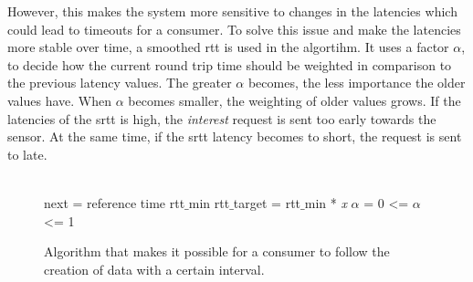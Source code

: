 However, this makes the system more sensitive to changes in the latencies which could lead to timeouts for a consumer. To solve this issue and make the latencies more stable over time, a smoothed rtt is used in the algortihm. It uses a factor $\alpha$, to decide how the current round trip time should be weighted in comparison to the previous latency values. The greater $\alpha$ becomes, the less importance the older values have. When $\alpha$ becomes smaller, the weighting of older values grows.
If the latencies of the srtt is high, the \textit{interest} request is sent too early towards the sensor. At the same time, if the srtt latency becomes to short, the request is sent to late.\\\\

   
\begin{figure}
\begin{algorithm}[H]
 next = reference time\;
 rtt$\_$min\;
 rtt$\_$target = rtt$\_$min * \textit{x}\;
 $\alpha$ = 0 <= $\alpha$ <= 1\;

\end{algorithm}
\caption{Algorithm that makes it possible for a consumer to follow the creation of data with a certain interval.}
    \label{fig:onetime}
\end{figure}


